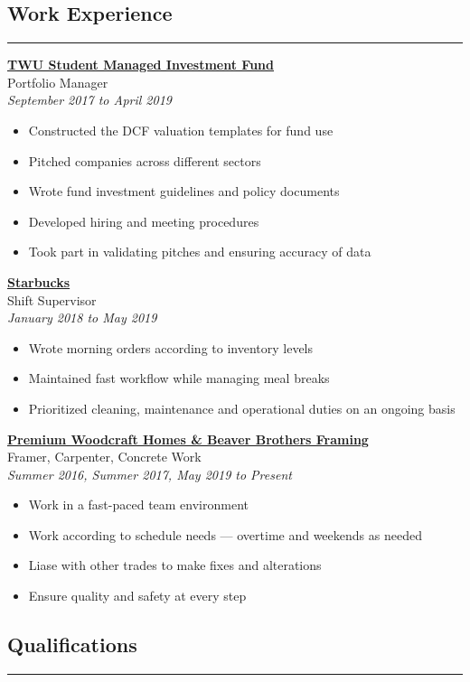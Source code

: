 \documentclass{article}
\newcommand{\bitem}{\item[$\bullet$]}
\begin{document}
\hfill
\begin{minipage}[t]{0.6\textwidth}
  \begin{center}
    \section*{Work Experience}
  \end{center}
\vspace{-2.8pt}
\hrule
\vspace{5pt}
\underline{\textbf{\large{TWU Student Managed Investment Fund}}}\\
\large Portfolio Manager\\
\normalsize\textit{September 2017 to April 2019}
\begin{itemize}
  \bitem Constructed the DCF valuation templates for fund use
  \bitem Pitched companies across different sectors
  \bitem Wrote fund investment guidelines and policy documents
  \bitem Developed hiring and meeting procedures
  \bitem Took part in validating pitches and ensuring accuracy of data
\end{itemize}

\underline{\textbf{\large{Starbucks}}}\\
\large Shift Supervisor\\
\normalsize\textit{January 2018 to May 2019}
\begin{itemize}
  \bitem Wrote morning orders according to inventory levels
  \bitem Maintained fast workflow while managing meal breaks
  \bitem Prioritized cleaning, maintenance and operational duties on an ongoing basis
\end{itemize}

\underline{\textbf{\large{Premium Woodcraft Homes \& Beaver Brothers Framing}}}\\
\large Framer, Carpenter, Concrete Work\\
\normalsize\textit{Summer 2016, Summer 2017, May 2019 to Present}
\begin{itemize}
  \bitem Work in a fast-paced team environment
  \bitem Work according to schedule needs --- overtime and weekends as needed
  \bitem Liase with other trades to make fixes and alterations
  \bitem Ensure quality and safety at every step
\end{itemize}

\vspace{-15pt}
\begin{center}
  \section*{Qualifications}
\end{center}
\hrule


\end{minipage}
\end{document}
